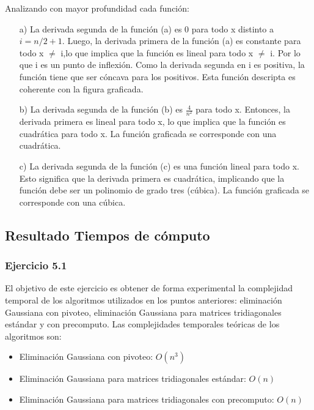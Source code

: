 Analizando con mayor profundidad cada función:\par
\begin{enumerate}
    \item[a)] La derivada segunda de la función (a) es 0 para todo x distinto a $i = n/2 + 1$. Luego, la derivada primera de la función (a) es constante para todo x $\not =$ i,lo que implica que la función es lineal para todo x $\not =$ i. Por lo que i es un punto de inflexión. Como la derivada segunda en i es positiva, la función tiene que ser cóncava para los positivos. Esta función descripta es coherente con la figura graficada.

    \item[b)] La derivada segunda de la función (b) es $\frac{4}{n^2}$ para todo x. Entonces, la derivada primera es lineal para todo x, lo que implica que la función es cuadrática para todo x. La función graficada se corresponde con una cuadrática.

    \item[c)] La derivada segunda de la función (c) es una función lineal para todo x. Esto significa que la derivada primera es cuadrática, implicando que la función debe ser un polinomio de grado tres (cúbica). La función graficada se corresponde con una cúbica.
\end{enumerate}

\subsection{Resultado Tiempos de cómputo}
\label{resultados tiempo}
\subsubsection{Ejercicio 5.1}
El objetivo de este ejercicio es obtener de forma experimental la complejidad temporal de los algoritmos utilizados en los puntos anteriores: eliminación Gaussiana con pivoteo, eliminación Gaussiana para matrices tridiagonales estándar y con precomputo. Las complejidades temporales teóricas de los algoritmos son:

\begin{itemize}
    \item Eliminación Gaussiana con pivoteo: $O(n^{3})$
    \item Eliminación Gaussiana para matrices tridiagonales estándar: $O(n)$
    \item Eliminación Gaussiana para matrices tridiagonales con precomputo: $O(n)$
\end{itemize}

